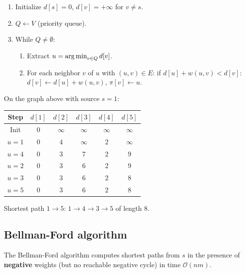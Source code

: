 \begin{algorithme}[title=\textbf{Dijkstra's Algorithm}]
\begin{enumerate}
  \item Initialize $d[s] = 0$, $d[v] = +\infty$ for $v \ne s$.
  \item $Q \leftarrow V$ (priority queue).
  \item While $Q \ne \emptyset$:
    \begin{enumerate}
      \item Extract $u = \operatorname*{arg\,min}_{v \in Q} d[v]$.
      \item For each neighbor $v$ of $u$ with $(u,v) \in E$:
        if $d[u] + w(u,v) < d[v]$:
        $d[v] \leftarrow d[u] + w(u,v)$, $\pi[v] \leftarrow u$.
    \end{enumerate}
\end{enumerate}
\end{algorithme}

\begin{example}[Dijkstra]
On the graph above with source $s = 1$:

\begin{center}
\begin{tabular}{c|ccccc}
  Step & $d[1]$ & $d[2]$ & $d[3]$ & $d[4]$ & $d[5]$ \\
  \hline
  Init & 0 & $\infty$ & $\infty$ & $\infty$ & $\infty$ \\
  $u=1$ & 0 & 4 & $\infty$ & 2 & $\infty$ \\
  $u=4$ & 0 & 3 & 7 & 2 & 9 \\
  $u=2$ & 0 & 3 & 6 & 2 & 9 \\
  $u=3$ & 0 & 3 & 6 & 2 & 8 \\
  $u=5$ & 0 & 3 & 6 & 2 & 8 \\
\end{tabular}
\end{center}

Shortest path $1 \to 5$: $1 \to 4 \to 3 \to 5$ of length 8.
\end{example}

\subsection{Bellman-Ford algorithm}

\begin{theorem}
The Bellman-Ford algorithm computes shortest paths from $s$ in the presence of
\textbf{negative} weights (but no reachable negative cycle) in time
$\mathcal{O}(nm)$.
\end{theorem}

